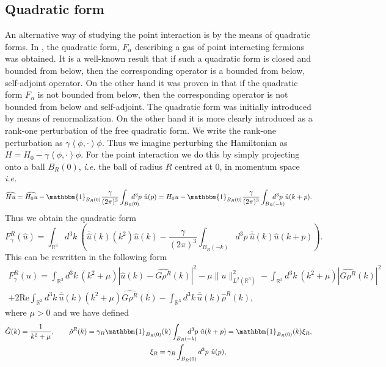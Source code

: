 \documentclass[a4paper,11pt]{article}
\newcommand{\Real}{\text{Re}}
\renewcommand{\braket}[1]{\left\langle#1\right\rangle}
\newcommand{\ie}{\emph{i.e.} }
\newcommand{\R}{\mathbb{R}}
\numberwithin{equation}{section}
\begin{document}
\subsection{Quadratic form}
\label{Subsection Quadratic form}
An alternative way of studying the point interaction is by the means of quadratic forms. In \cite{FINCO2012131}, the quadratic form, $ F_\alpha $ describing a gas of point interacting fermions was obtained. It is a well-known result that if such a quadratic form is closed and bounded from below, then the corresponding operator is a bounded from below, self-adjoint operator. On the other hand it was proven in \cite{FINCO2012131} that if the quadratic form $ F_\alpha $ is not bounded from below, then the corresponding operator is not bounded from below and self-adjoint. The quadratic form was initially introduced by means of renormalization. On the other hand it is more clearly introduced as a rank-one perturbation of the free quadratic form. We write the rank-one perturbation as $ \gamma\braket{\phi,\cdot}\phi $. Thus we imagine perturbing the Hamiltonian as $ H=H_0-\gamma\braket{\phi,\cdot}\phi $. For the point interaction we do this by simply projecting onto a ball $ B_R(0) $, \ie the ball of radius $ R $ centred at $ 0 $, in momentum space \ie\begin{equation}
\widehat{Hu}=\widehat{H_0u}-\mathbbm{1}_{B_R(0)}\frac{\gamma}{(2\pi)^3}\int_{B_R(0)}\!\!\!\!\!\!\!\!d^3p\ \hat{u}(p)=H_0u-\mathbbm{1}_{B_R(0)}\frac{\gamma}{(2\pi)^3}\int_{B_R(-k)}\!\!\!\!\!\!\!\!\!\!\!\! d^3p\ \hat{u}(k+p).
\end{equation}
Thus we obtain the quadratic form\begin{equation}
F^R_\gamma(\hat{u})=\int_{\R^3} d^3k\ \left(\bar{\hat{u}}(k)(k^2)\hat{u}(k)-\frac{\gamma}{(2\pi)^3}\int_{B_R(-k)}\!\!\!\!\!\!\!\!\!\!\!\! d^3p\ \bar{\hat{u}}(k) \hat{u}(k+p)\right).
\end{equation}
This can be rewritten in the following form\begin{equation}
	\begin{aligned}
	F_\gamma^R(u)=\int_{\R^3} d^3k\ \left(k^2+\mu\right)|\hat{u}(k)-\widehat{G\rho^R}(k)|^2-\mu\|u\|^2_{L^2(\R^3)}-\int_{\R^3} d^3k\ (k^2+\mu)|\widehat{G\rho^R}(k)|^2\\
	+2\Real \int_{\R^3} d^3k\ \bar{\hat{u}}(k)(k^2+\mu)\widehat{G\rho^R}(k)-\int_{\R^3} d^3k\ \bar{\hat{u}}(k)\hat{\rho}^R(k),
	\end{aligned}
\end{equation}
where $ \mu>0 $ and we have defined
\begin{equation}
\begin{aligned}
\hat{G}(k)=\frac{1}{k^2+\mu},\qquad \hat{\rho}^R(k)=\gamma_R\mathbbm{1}_{B_R(0)}(k)\int_{B_R(-k)}\!\!\!\!\!\!\!\!\!d^3p\ \hat{u}(k+p) =\mathbbm{1}_{B_R(0)}(k)\xi_R,\\
\xi_R=\gamma_R\int_{B_R(0)} d^3p\ \hat{u}(p),\qquad\qquad\qquad\qquad\qquad\qquad
\end{aligned}
\end{equation}
\end{document}
